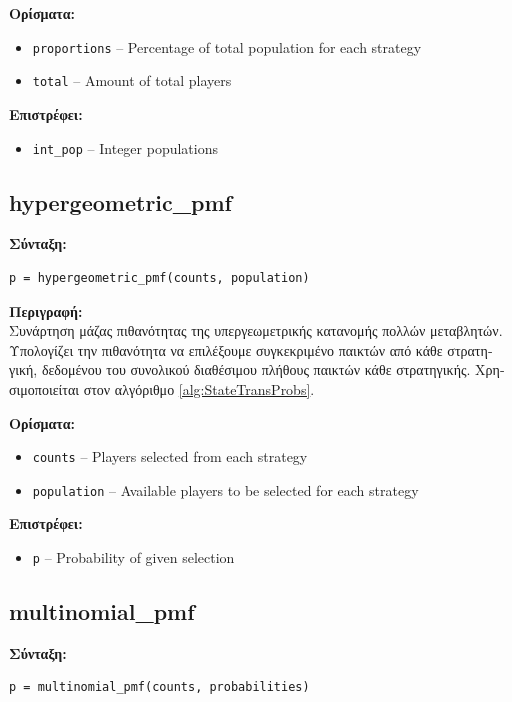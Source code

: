 \documentclass[12pt]{report}
\begin{document}
\textbf{\foreignlanguage{greek}{Ορίσματα:}}
\begin{itemize}
    \item \texttt{proportions} – Percentage of total population for each strategy
    \item \texttt{total} – Amount of total players
\end{itemize}

\textbf{\foreignlanguage{greek}{Επιστρέφει}:}
\begin{itemize}
    \item \texttt{int\_pop} – Integer populations
\end{itemize}


\subsection*{hypergeometric\_pmf}

\textbf{\foreignlanguage{greek}{Σύνταξη}:}
\begin{verbatim}
p = hypergeometric_pmf(counts, population)
\end{verbatim}

\textbf{\foreignlanguage{greek}{Περιγραφή:}} \\
\foreignlanguage{greek}{Συνάρτηση μάζας πιθανότητας της υπεργεωμετρικής κατανομής πολλών μεταβλητών. Υπολογίζει την πιθανότητα να επιλέξουμε συγκεκριμένο παικτών από κάθε στρατηγική, δεδομένου του συνολικού διαθέσιμου πλήθους παικτών κάθε στρατηγικής. Χρησιμοποιείται στον αλγόριθμο \ref{alg:StateTransProbs}.}

\textbf{\foreignlanguage{greek}{Ορίσματα:}}
\begin{itemize}
    \item \texttt{counts} – Players selected from each strategy
    \item \texttt{population} – Available players to be selected for each strategy
\end{itemize}

\textbf{\foreignlanguage{greek}{Επιστρέφει}:}
\begin{itemize}
    \item \texttt{p} – Probability of given selection
\end{itemize}

\subsection*{multinomial\_pmf}

\textbf{\foreignlanguage{greek}{Σύνταξη}:}
\begin{verbatim}
p = multinomial_pmf(counts, probabilities)
\end{verbatim}
\end{document}
